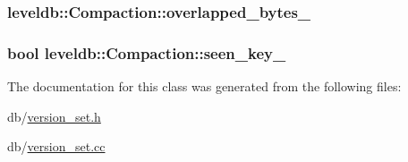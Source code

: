 \hypertarget{classleveldb_1_1_compaction_ae70f3aa618e8db3610726f6684b80335}{
\subsubsection[{overlapped\-\_\-bytes\-\_\-}]{ leveldb\-::\-Compaction\-::overlapped\-\_\-bytes\-\_\-\hspace{0.3cm}{\ttfamily [private]}}}\label{classleveldb_1_1_compaction_ae70f3aa618e8db3610726f6684b80335}
\hypertarget{classleveldb_1_1_compaction_adb523506dfa03c896a813d1248899da8}{
\subsubsection[{seen\-\_\-key\-\_\-}]{\setlength{\rightskip}{0pt plus 5cm}bool leveldb\-::\-Compaction\-::seen\-\_\-key\-\_\-\hspace{0.3cm}{\ttfamily [private]}}}\label{classleveldb_1_1_compaction_adb523506dfa03c896a813d1248899da8}


The documentation for this class was generated from the following files\-:\begin{DoxyCompactItemize}
\item 
db/\hyperlink{version__set_8h}{version\-\_\-set.\-h}\item 
db/\hyperlink{version__set_8cc}{version\-\_\-set.\-cc}\end{DoxyCompactItemize}
